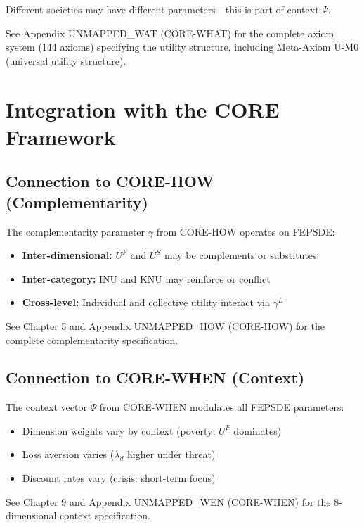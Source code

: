 Different societies may have different parameters---this is part of context $\Psi$.

\begin{cross-reference}
See Appendix UNMAPPED_WAT (CORE-WHAT) for the complete axiom system (144 axioms)
specifying the utility structure, including Meta-Axiom U-M0 (universal utility structure).
\end{cross-reference}



\section{Integration with the CORE Framework}
\label{sec:fepsde-integration}


\subsection{Connection to CORE-HOW (Complementarity)}
\label{sec:fepsde-complementarity}

\begin{cross-reference}
The complementarity parameter $\gamma$ from CORE-HOW operates on FEPSDE:
\begin{itemize}[nosep]
  \item \textbf{Inter-dimensional:} $U^F$ and $U^S$ may be complements or substitutes
  \item \textbf{Inter-category:} INU and KNU may reinforce or conflict
  \item \textbf{Cross-level:} Individual and collective utility interact via $\gamma^L$
\end{itemize}
See Chapter 5 and Appendix UNMAPPED_HOW (CORE-HOW) for the complete complementarity specification.
\end{cross-reference}

\subsection{Connection to CORE-WHEN (Context)}
\label{sec:fepsde-context}

\begin{cross-reference}
The context vector $\Psi$ from CORE-WHEN modulates all FEPSDE parameters:
\begin{itemize}[nosep]
  \item Dimension weights vary by context (poverty: $U^F$ dominates)
  \item Loss aversion varies ($\lambda_d$ higher under threat)
  \item Discount rates vary (crisis: short-term focus)
\end{itemize}
See Chapter 9 and Appendix UNMAPPED_WEN (CORE-WHEN) for the 8-dimensional context specification.
\end{cross-reference}

